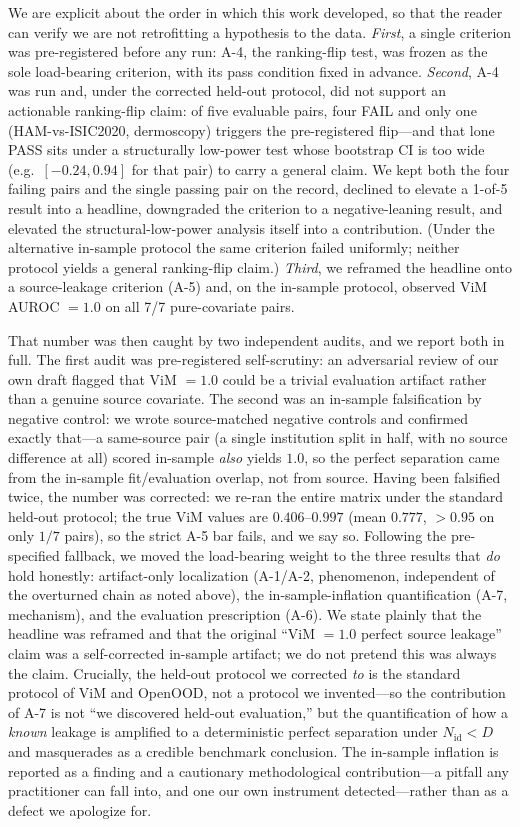 \documentclass{article}
\begin{document}
We are explicit about the order in which this work developed, so that the reader
can verify we are not retrofitting a hypothesis to the data. \emph{First}, a
single criterion was pre-registered before any run: A-4, the ranking-flip test,
was frozen as the sole load-bearing criterion, with its pass condition fixed in
advance. \emph{Second}, A-4 was run and, under the corrected held-out protocol,
did not support an actionable ranking-flip claim: of five evaluable pairs, four
FAIL and only one (HAM-vs-ISIC2020, dermoscopy) triggers the pre-registered
flip---and that lone PASS sits under a structurally low-power test whose bootstrap
CI is too wide (e.g.\ $[-0.24, 0.94]$ for that pair) to carry a general claim. We
kept both the four failing pairs and the single passing pair on the record,
declined to elevate a 1-of-5 result into a headline, downgraded the criterion to
a negative-leaning result, and elevated the structural-low-power analysis itself
into a contribution. (Under the alternative in-sample protocol the same criterion
failed uniformly; neither protocol yields a general ranking-flip claim.)
\emph{Third}, we reframed the headline onto a source-leakage criterion (A-5) and,
on the in-sample protocol, observed ViM AUROC $=1.0$ on all 7/7 pure-covariate
pairs.

That number was then caught by two independent audits, and we report both in
full. The first audit was pre-registered self-scrutiny: an adversarial review of
our own draft flagged that ViM $=1.0$ could be a trivial evaluation artifact
rather than a genuine source covariate. The second was an in-sample falsification
by negative control: we wrote source-matched negative controls and confirmed
exactly that---a same-source pair (a single institution split in half, with no
source difference at all) scored in-sample \emph{also} yields $1.0$, so the
perfect separation came from the in-sample fit/evaluation overlap, not from
source. Having been falsified twice, the number was corrected: we re-ran the
entire matrix under the standard held-out protocol; the true ViM values are
$0.406$--$0.997$ (mean $0.777$, $>0.95$ on only $1/7$ pairs), so the strict A-5
bar fails, and we say so. Following the pre-specified fallback, we moved the
load-bearing weight to the three results that \emph{do} hold honestly:
artifact-only localization (A-1/A-2, phenomenon, independent of the overturned
chain as noted above), the in-sample-inflation quantification (A-7, mechanism),
and the evaluation prescription (A-6). We state plainly that the headline was
reframed and that the original ``ViM $=1.0$ perfect source leakage'' claim was a
self-corrected in-sample artifact; we do not pretend this was always the claim.
Crucially, the held-out protocol we corrected \emph{to} is the standard protocol
of ViM and OpenOOD, not a protocol we invented---so the contribution of A-7 is
not ``we discovered held-out evaluation,'' but the quantification of how a
\emph{known} leakage is amplified to a deterministic perfect separation under
$N_\text{id} < D$ and masquerades as a credible benchmark conclusion. The
in-sample inflation is reported as a finding and a cautionary methodological
contribution---a pitfall any practitioner can fall into, and one our own
instrument detected---rather than as a defect we apologize for.
\end{document}
